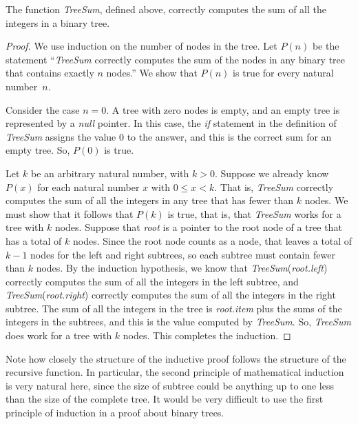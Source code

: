 \begin{theorem}
The function \textit{TreeSum}, defined above, correctly
computes the sum of all the integers in a binary tree.
\end{theorem}
\begin{proof}
We use induction on the number of nodes in the tree.
Let $P(n)$ be the statement ``\textit{TreeSum}
correctly computes the sum of the nodes in any binary tree
that contains exactly $n$ nodes.''  We show that $P(n)$ is true
for every natural number~$n$.

Consider the case $n=0$.  A tree with zero nodes is empty,
and an empty tree is represented by a \textit{null} pointer.
In this case, the \textit{if} statement in the definition of
\textit{TreeSum} assigns the value 0 to the answer, and this is
the correct sum for an empty tree.  So, $P(0)$ is true.

Let $k$ be an arbitrary natural number, with $k>0$.  Suppose we already
know $P(x)$ for each natural number $x$ with $0\le x < k$.  That is,
\textit{TreeSum} correctly computes the sum of all the integers in
any tree that has fewer than $k$ nodes.  We must show that it follows
that $P(k)$ is true, that is, that \textit{TreeSum} works for 
a tree with $k$ nodes.  Suppose that \textit{root} is a pointer
to the root node of a tree that has a total of $k$ nodes.
Since the root node counts as a node, that leaves a total of
$k-1$ nodes for the left and right subtrees, so each subtree
must contain fewer than $k$ nodes.  By the induction hypothesis,
we know that \textit{TreeSum}(\textit{root.left}) correctly
computes the sum of all the integers in the left subtree, and
\textit{TreeSum}(\textit{root.right}) correctly computes the
sum of all the integers in the right subtree.  The sum of all
the integers in the tree is \textit{root.item} plus the
sums of the integers in the subtrees, and this is the value
computed by \textit{TreeSum}.  So, \textit{TreeSum} does
work for a tree with $k$ nodes.  This completes the induction.
\end{proof}

Note how closely the structure of the inductive proof follows the 
structure of the recursive function.  In particular, the
second principle of mathematical induction is very natural here, since
the size of subtree could be anything up to one less than
the size of the complete tree.  It would be very difficult
to use the first principle of induction in a proof about
binary trees.

